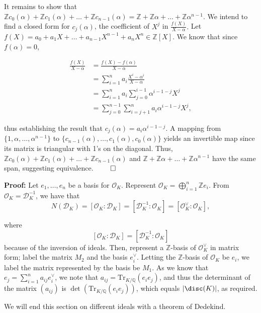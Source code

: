 \documentclass[a4paper, 12pt,oneside,openany]{book}
\begin{document}
It remains to show that $\mathbb{Z}c_0(\alpha)+\mathbb{Z}c_1(\alpha)+\dots+\mathbb{Z}c_{n-1}(\alpha)=\mathbb{Z}+\mathbb{Z}\alpha+\dots+\mathbb{Z}\alpha^{n-1}.$ We intend to find a closed form for $c_j(\alpha)$, the coefficient of $X^j$ in $\frac{f(X)}{X-\alpha}.$ Let $f(X)=a_0+a_1X+\dots+a_{n-1}X^{n-1}+a_nX^n \in \mathbb{Z}[X].$ We know that since $f(\alpha)=0$, 

\begin{align*}
    \frac{f(X)}{X-\alpha}&= \frac{f(X)-f(\alpha)}{X-\alpha} \\
    &= \sum\limits_{i=1}^n a_i \frac{X^i-\alpha^i}{X-\alpha} \\
    &= \sum\limits_{i=1}^n a_i \sum\limits_{j=0}^{i-1} \alpha^{i-1-j} X^j \\
    &= \sum\limits_{j=0}^{n-1} \sum\limits_{i=j+1}^n a_i\alpha^{i-1-j}X^j,
\end{align*}

thus establishing the result that $c_j(\alpha)=a_i \alpha^{i-1-j}$. A mapping from $\{1, \alpha, \dots, \alpha^{n-1}\}$ to $\{c_{n-1}(\alpha), \dots, c_1(\alpha), c_0(\alpha)\}$ yields an invertible map since its matrix is triangular with 1's on the diagonal. Thus, $\mathbb{Z}c_0(\alpha)+\mathbb{Z}c_1(\alpha)+\dots+\mathbb{Z}c_{n-1}(\alpha)$ and $\mathbb{Z}+\mathbb{Z}\alpha+\dots+\mathbb{Z}\alpha^{n-1}$ have the same span, suggesting equivalence. $\qed$


\textbf{Proof:} Let $e_1, \dots, e_n$ be a basis for $\mathcal{O}_K$. Represent $\mathcal{O}_K=\bigoplus\limits_{i=1}^n \mathbb{Z} e_i.$ From $\mathcal{O}_K = \mathcal{D}_K^{-1}$, we have that $$N(\mathcal{D}_K)=[\mathcal{O}_K:\mathcal{D}_K]=[\mathcal{D}_K^{-1}:\mathcal{O}_K]=[\mathcal{O}_K^{\vee}:\mathcal{O}_K],$$

where $$[\mathcal{O}_K:\mathcal{D}_K]=[\mathcal{D}_K^{-1}:\mathcal{O}_K]$$ because of the inversion of ideals. Then, represent a $\mathbb{Z}$-basis of $\mathcal{O}_K^{\vee}$ in matrix form; label the matrix $M_2$ and the basis $e_i^{\vee}.$ Letting the $\mathbb{Z}$-basis of $\mathcal{O}_K$ be $e_i$, we label the matrix represented by the basis be $M_1$.  As we know that $e_j=\sum\limits_{i=1}^n a_{ij} e_i^{\vee}$, we note that $a_{ij}=\text{Tr}_{K/\mathbb{Q}} (e_ie_j)$, and thus the determinant of the matrix $(a_{ij})$ is $\det(\text{Tr}_{K/\mathbb{Q}} (e_ie_j))$, which equals $|\disc(K)|$, as required.

We will end this section on different ideals with a theorem of Dedekind.
\end{document}
